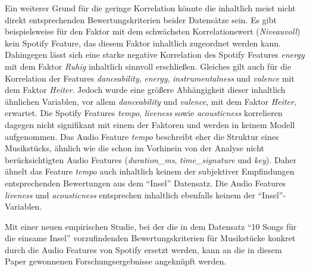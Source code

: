 Ein weiterer Grund für die geringe Korrelation könnte die inhaltlich meist nicht direkt entsprechenden Bewertungskriterien beider Datensätze sein.
Es gibt beispielsweise für den Faktor mit dem schwächsten Korrelationswert (\textit{Niveauvoll}) kein Spotify Feature, das diesem Faktor inhaltlich zugeordnet werden kann.
Dahingegen lässt sich eine starke negative Korrelation des Spotify Features \textit{energy} mit dem Faktor \textit{Ruhig} inhaltlich sinnvoll erschließen.
Gleiches gilt auch für die Korrelation der Features \textit{danceability}, \textit{energy}, \textit{instrumentalness} und \textit{valence} mit dem Faktor \textit{Heiter}.
Jedoch wurde eine größere Abhängigkeit dieser inhaltlich ähnlichen Variablen, vor allem \textit{danceability} und \textit{valence}, mit dem Faktor \textit{Heiter}, erwartet.
Die Spotify Features \textit{tempo}, \textit{liveness} sowie \textit{acousticness} korrelieren dagegen nicht signifikant mit einem der Faktoren und werden in keinem Modell aufgenommen. 
Das Audio Feature \textit{tempo} beschreibt eher die Struktur eines Musikstücks, ähnlich wie die schon im Vorhinein von der Analyse nicht berücksichtigten Audio Features (\textit{duration\_ms}, \textit{time\_signature} und \textit{key}).
Daher ähnelt das Feature \textit{tempo} auch inhaltlich keinem der subjektiver Empfindungen entsprechenden Bewertungen aus dem "`Insel"' Datensatz.
Die Audio Features \textit{liveness} und \textit{acousticness} entsprechen inhaltlich ebenfalls keinem der "`Insel"'-Variablen.  

Mit einer neuen empirischen Studie, bei der die in dem Datensatz "`10 Songs für die einsame Insel"' vorzufindenden Bewertungskriterien für Musikstücke konkret durch die Audio Features von Spotify ersetzt werden, kann an die in diesem Paper gewonnenen Forschungsergebnisse angeknüpft werden.



